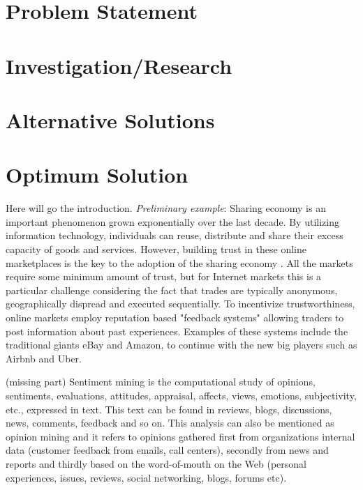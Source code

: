 \documentclass[a4paper, 11pt]{article}
\begin{document}
\section*{Problem Statement}

\section*{Investigation/Research}


\section*{Alternative Solutions}


\section*{Optimum Solution}

Here will go the introduction. \textit{Preliminary example}: Sharing economy is an important phenomenon grown exponentially over the last decade. By utilizing information technology, individuals can reuse, distribute and share their excess capacity of goods and services. However, building trust in these online marketplaces is the key to the adoption of the sharing economy \cite{owen2014trust}. All the markets require some minimum amount of trust, but for Internet markets this is a particular challenge considering the fact that trades are typically anonymous, geographically dispread and executed sequentially. To incentivize trustworthiness, online markets employ reputation based "feedback systems" allowing traders to post information about past experiences. Examples of these systems include the traditional giants eBay and Amazon, to continue with the new big players such as Airbnb and Uber.

(missing part)
Sentiment mining is the computational study of opinions, sentiments, evaluations, attitudes, appraisal, affects, views, emotions, subjectivity, etc., expressed in text. This text can be found in reviews, blogs, discussions, news, comments, feedback and so on. This analysis can also be mentioned as opinion mining and it refers to opinions gathered first from organizations internal data (customer feedback from emails, call centers), secondly from news and reports and thirdly based on the word-of-mouth on the Web (personal experiences, issues, reviews, social networking, blogs, forums etc). 
\end{document}
